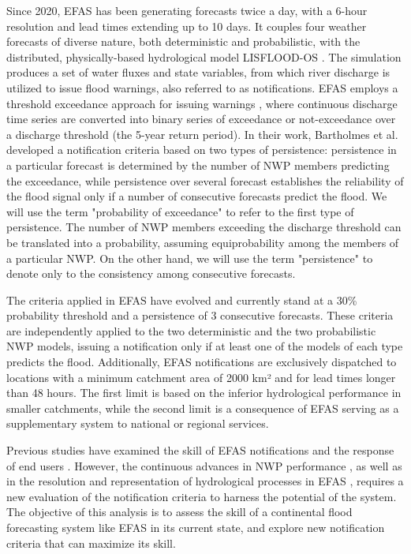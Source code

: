 \documentclass[preprint,12pt,authoryear]{elsarticle}
\begin{document}
Since 2020, EFAS has been generating forecasts twice a day, with a 6-hour resolution and lead times extending up to 10 days. It couples four weather forecasts of diverse nature, both deterministic and probabilistic, with the distributed, physically-based hydrological model LISFLOOD-OS \cite{Burek2013a}. The simulation produces a set of water fluxes and state variables, from which river discharge is utilized to issue flood warnings, also referred to as notifications. EFAS employs a threshold exceedance approach for issuing warnings \cite{Bartholmes2009}, where continuous discharge time series are converted into binary series of exceedance or not-exceedance over a discharge threshold (the 5-year return period). In their work, Bartholmes et al. \cite{Bartholmes2009} developed a notification criteria based on two types of persistence: persistence in a particular forecast is determined by the number of NWP members predicting the exceedance, while persistence over several forecast establishes the reliability of the flood signal only if a number of consecutive forecasts predict the flood. We will use the term "probability of exceedance" to refer to the first type of persistence.  The number of NWP members exceeding the discharge threshold can be translated into a probability, assuming equiprobability among the members of a particular NWP. On the other hand, we will use the term "persistence" to denote only to the consistency among consecutive forecasts. 

The criteria applied in EFAS have evolved and currently stand at a 30\% probability threshold and a persistence of 3 consecutive forecasts. These criteria are independently applied to the two deterministic and the two probabilistic NWP models, issuing a notification only if at least one of the models of each type predicts the flood. Additionally, EFAS notifications are exclusively dispatched to locations with a minimum catchment area of 2000 km² and for lead times longer than 48 hours. The first limit is based on the inferior hydrological performance in smaller catchments, while the second limit is a consequence of EFAS serving as a supplementary system to national or regional services.

Previous studies have examined the skill of EFAS notifications \cite{Bartholmes2009} and the response of end users \cite{Demeritt2013}. However, the continuous advances in NWP performance \cite{Bauer2015}, as well as in the resolution and representation of hydrological processes in EFAS \cite{EFASv4.0, EFASv5.0}, requires a new evaluation of the notification criteria to harness the potential of the system. The objective of this analysis is to assess the skill of a continental flood forecasting system like EFAS in its current state, and explore new notification criteria that can maximize its  skill. 
\end{document}
